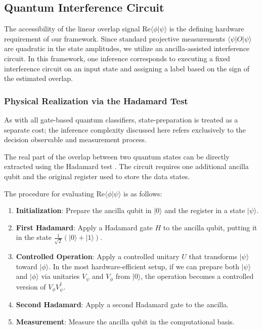 \documentclass[conference]{IEEEtran}
\begin{document}
\subsection{Quantum Interference Circuit}
The accessibility of the linear overlap signal $\mathrm{Re}\langle \phi | \psi \rangle$ is the defining hardware requirement of our framework. Since standard projective measurements $\langle \psi | O | \psi \rangle$ are quadratic in the state amplitudes, we utilize an ancilla-assisted interference circuit. In this framework, one inference corresponds to executing a fixed interference circuit on an input state and assigning a label based on the sign of the estimated overlap.

\subsubsection{Physical Realization via the Hadamard Test}
As with all gate-based quantum classifiers, state-preparation is treated as a separate cost; the inference complexity discussed here refers exclusively to the decision observable and measurement process.

The real part of the overlap between two quantum states can be directly extracted using the Hadamard test \cite{ekert2002direct}. The circuit requires one additional ancilla qubit and the original register used to store the data states.

The procedure for evaluating $\mathrm{Re}\langle \phi | \psi \rangle$ is as follows:
\begin{enumerate}
    \item \textbf{Initialization}: Prepare the ancilla qubit in $|0\rangle$ and the register in a state $|\psi\rangle$.
    \item \textbf{First Hadamard}: Apply a Hadamard gate $H$ to the ancilla qubit, putting it in the state $\frac{1}{\sqrt{2}}(|0\rangle + |1\rangle)$.
    \item \textbf{Controlled Operation}: Apply a controlled unitary $U$ that transforms $|\psi\rangle$ toward $|\phi\rangle$. In the most hardware-efficient setup, if we can prepare both $|\psi\rangle$ and $|\phi\rangle$ via unitaries $V_\psi$ and $V_\phi$ from $|0\rangle$, the operation becomes a controlled version of $V_\phi V_\psi^\dagger$.
    \item \textbf{Second Hadamard}: Apply a second Hadamard gate to the ancilla.
    \item \textbf{Measurement}: Measure the ancilla qubit in the computational basis.
\end{enumerate}
\end{document}
